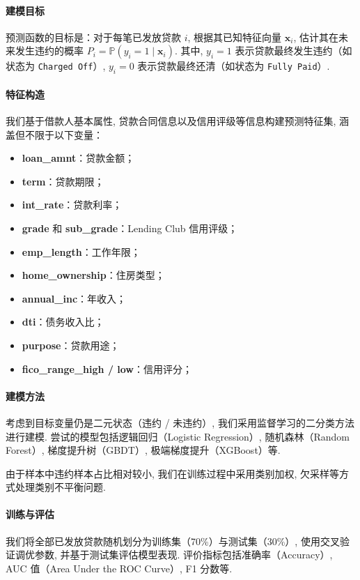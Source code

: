 \documentclass[12pt,nonblindrev]{write_paper}
\begin{document}
\paragraph{建模目标} 
预测函数的目标是：对于每笔已发放贷款 $i$, 根据其已知特征向量 $\mathbf{x}_i$, 估计其在未来发生违约的概率 $P_i = \mathbb{P}(y_i = 1 \mid \mathbf{x}_i)$. 其中, $y_i=1$ 表示贷款最终发生违约（如状态为 \texttt{Charged Off}）, $y_i=0$ 表示贷款最终还清（如状态为 \texttt{Fully Paid}）. 

\paragraph{特征构造}
我们基于借款人基本属性, 贷款合同信息以及信用评级等信息构建预测特征集, 涵盖但不限于以下变量：

\begin{itemize}
  \item \textbf{loan\_amnt}：贷款金额；
  \item \textbf{term}：贷款期限；
  \item \textbf{int\_rate}：贷款利率；
  \item \textbf{grade} 和 \textbf{sub\_grade}：Lending Club 信用评级；
  \item \textbf{emp\_length}：工作年限；
  \item \textbf{home\_ownership}：住房类型；
  \item \textbf{annual\_inc}：年收入；
  \item \textbf{dti}：债务收入比；
  \item \textbf{purpose}：贷款用途；
  \item \textbf{fico\_range\_high / low}：信用评分；
\end{itemize}

\paragraph{建模方法}
考虑到目标变量仍是二元状态（违约 / 未违约）, 我们采用监督学习的二分类方法进行建模. 尝试的模型包括逻辑回归（Logistic Regression）, 随机森林（Random Forest）, 梯度提升树（GBDT）, 极端梯度提升（XGBoost）等. 

由于样本中违约样本占比相对较小, 我们在训练过程中采用类别加权, 欠采样等方式处理类别不平衡问题. 

\paragraph{训练与评估}

我们将全部已发放贷款随机划分为训练集（70\%）与测试集（30\%）, 使用交叉验证调优参数, 并基于测试集评估模型表现. 评价指标包括准确率（Accuracy）, AUC 值（Area Under the ROC Curve）, F1 分数等. 
\end{document}
